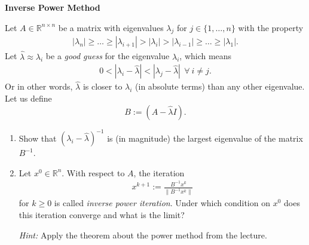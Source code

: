 \textbf{Inverse Power Method}

 \label{ex:inversepowertheory}
Let $A \in \mathbb{R}^{n \times n}$ be a matrix with eigenvalues $\lambda_j$ for $j \in  \{1,\dots,n\}$ with the property
\begin{align*}
|\lambda_n| \geq \dots \geq |\lambda_{i+1}|  > |\lambda_i| > |\lambda_{i-1}| \geq \dots \geq |\lambda_1|. 
\end{align*}
Let $\hat{\lambda} \approx \lambda_i$ be a \textit{good guess} for the eigenvalue $\lambda_i$, which means
\begin{align}
0 < |\lambda_i - \hat{\lambda} | < |\lambda_j -  \hat{\lambda} | ~~\forall~ i \neq j.
\end{align}
Or in other words, $\hat{\lambda}$ is closer to $\lambda_i$ (in absolute terms) than any other eigenvalue.\\
Let us define $$B := (A - \hat{\lambda} I). $$

\begin{enumerate}
	\item Show that $(\lambda_i - \hat{\lambda})^{-1}$  is (in magnitude) the largest eigenvalue of the matrix $B^{-1}$.
	
	\item Let $x^0 \in \mathbb{R}^n$. With respect to $A$, the iteration
	\begin{align}
	x^{k+1} := \frac{B^{-1} x^k}{\|B^{-1} x^k\|} \label{inv_powerit}
	\end{align}
	for $k \geq 0$ is called \textit{inverse power iteration}. Under which condition on $x^0$ does this iteration converge and what is the limit?
	
	\textit{Hint:} Apply the theorem about the power method from the lecture.
%	
\end{enumerate}